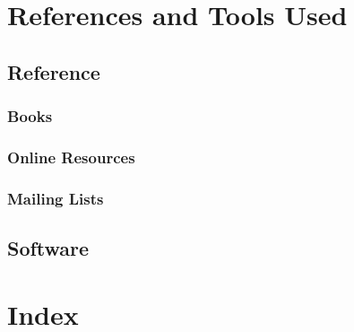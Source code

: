 \documentclass[a4paper,12pt]{report}
\begin{document}
\chapter{References and Tools Used}

\section{Reference}

\subsection{Books}



\subsection{Online Resources}



\subsection{Mailing Lists}



\section{Software}




\chapter{Index}

\printindex 
\end{document}
